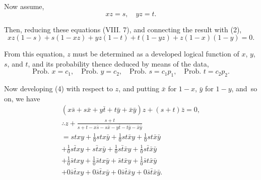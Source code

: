 \documentclass[oneside]{book}
\begin{document}
Now assume,
\[
  xz = s,\quad  yz = t.    \tag{3}
\]

Then, reducing these equations (VIII. 7), and connecting the
result with (2),
\[
  xz(1-s) + s(1-xz) + yz(1-t) + t(1-yz) + z(1-x)(1-y) = 0.  \tag{4}
\]

From this equation, $z$ must be determined as a developed
logical function of $x$, $y$, $s$, and $t$, and its probability thence deduced by means of the data,
\[
  \text{Prob. }x = c_1,\quad \text{Prob. }y = c_2,\quad
  \text{Prob. }s = c_1p_1,\quad \text{Prob. }t = c_2p_2.   \tag{5}
\]

Now developing (4) with respect to $z$, and putting $\bar{x}$ for
$1 - x$, $\bar{y}$ for $1 - y$, and\footnotemark\ so on, we have
\begin{gather*}
  (x\bar{s} + s\bar{x} + y\bar{t} + t\bar{y} + \bar{x}\bar{y})z
   + (s + t)\bar{z} = 0,   \\
  \therefore z + \frac{s+t}{s + t
 - x\bar{s} - s\bar{x} - y\bar{t} - t\bar{y} - \bar{x}\bar{y}}  \\
%
  =            st     x      y
  + \frac{1}{0}st     x \bar{y}
  + \frac{1}{0}st\bar{x}     y
  + \frac{1}{0}st\bar{x}\bar{y}   \\
%
  + \frac{1}{0}s\bar{t}     x      y
  +            s\bar{t}     x \bar{y}
  + \frac{1}{0}s\bar{t}\bar{x}     y
  + \frac{1}{0}s\bar{t}\bar{x}\bar{y}\\
%
  + \frac{1}{0}\bar{s}t     x      y
  + \frac{1}{0}\bar{s}t     x \bar{y}
  +            \bar{s}t\bar{x}     y
  + \frac{1}{0}\bar{s}t\bar{x}\bar{y} \\
%
  + 0\bar{s}\bar{t}     x      y
  + 0\bar{s}\bar{t}     x \bar{y}
  + 0\bar{s}\bar{t}\bar{x}     y
  + 0\bar{s}\bar{t}\bar{x}\bar{y}.  \tag{6}
\end{gather*}
\end{document}
